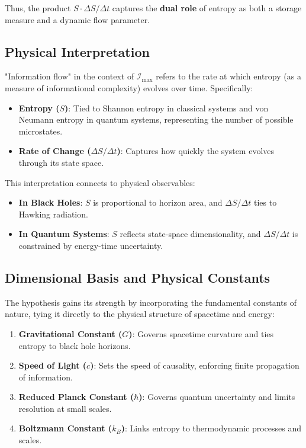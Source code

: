 \documentclass[12pt]{article}
\begin{document}
Thus, the product \( S \cdot \Delta S / \Delta t \) captures the \textbf{dual role} of entropy as both a storage measure and a dynamic flow parameter.

\subsection{Physical Interpretation}
"Information flow" in the context of \( \mathcal{I}_{\text{max}} \) refers to the rate at which entropy (as a measure of informational complexity) evolves over time. Specifically:
\begin{itemize}
    \item \textbf{Entropy (\( S \))}: Tied to Shannon entropy in classical systems and von Neumann entropy in quantum systems, representing the number of possible microstates.
    \item \textbf{Rate of Change (\( \Delta S / \Delta t \))}: Captures how quickly the system evolves through its state space.
\end{itemize}

This interpretation connects to physical observables:
\begin{itemize}
    \item \textbf{In Black Holes}: \( S \) is proportional to horizon area, and \( \Delta S / \Delta t \) ties to Hawking radiation.
    \item \textbf{In Quantum Systems}: \( S \) reflects state-space dimensionality, and \( \Delta S / \Delta t \) is constrained by energy-time uncertainty.
\end{itemize}


\subsection{Dimensional Basis and Physical Constants}
The hypothesis gains its strength by incorporating the fundamental constants of nature, tying it directly to the physical structure of spacetime and energy:
\begin{enumerate}
    \item \textbf{Gravitational Constant (\( G \))}: Governs spacetime curvature and ties entropy to black hole horizons.
    \item \textbf{Speed of Light (\( c \))}: Sets the speed of causality, enforcing finite propagation of information.
    \item \textbf{Reduced Planck Constant (\( \hbar \))}: Governs quantum uncertainty and limits resolution at small scales.
    \item \textbf{Boltzmann Constant (\( k_B \))}: Links entropy to thermodynamic processes and scales.
\end{enumerate}
\end{document}

